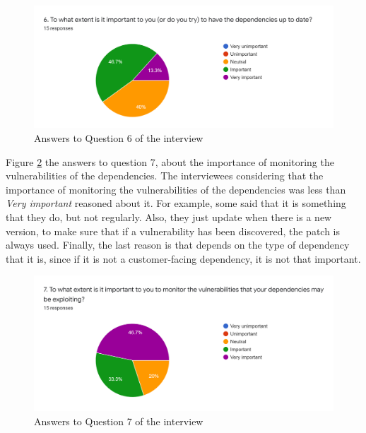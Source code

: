 \begin{figure}[ht]
\begin{center}
\includegraphics[width=\textwidth]{figures/interview/Question6.png}
\caption{Answers to Question 6 of the interview}
\label{fig:interview-6}
\end{center}
\end{figure}

 Figure \ref{fig:interview-7} the answers to question 7, about the importance of monitoring the vulnerabilities of the dependencies. The interviewees considering that the importance of monitoring the vulnerabilities of the dependencies was less than \textit{Very important} reasoned about it. For example, some said that it is something that they do, but not regularly. Also, they just update when there is a new version, to make sure that if a vulnerability has been discovered, the patch is always used. Finally, the last reason is that depends on the type of dependency that it is, since if it is not a customer-facing dependency, it is not that important.

\begin{figure}[ht]
\begin{center}
\includegraphics[width=\textwidth]{figures/interview/Question7.png}
\caption{Answers to Question 7 of the interview}
\label{fig:interview-7}
\end{center}
\end{figure}


